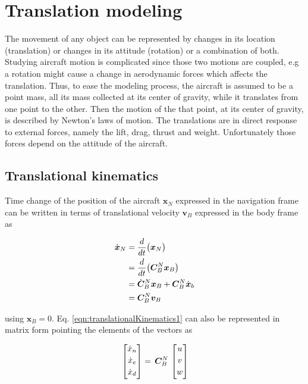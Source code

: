 \section{Translation modeling}

The movement of any object can be represented by changes in its location (translation) or changes in its attitude (rotation) or a combination of both. 
Studying aircraft motion is complicated since those two motions are coupled, e.g a rotation might cause a change in aerodynamic forces which affects the translation. 
Thus, to ease the modeling process, the aircraft is assumed to be a point mass, all its mass collected at its center of gravity, while it translates from one point to the other.
Then the motion of the that point, at its center of gravity, is described by Newton's laws of motion.
The translations are in direct response to external forces, namely the lift, drag, thrust and weight.
Unfortunately those forces depend on the attitude of the aircraft.

\subsection{Translational kinematics}

Time change of the position of the aircraft $\bm{x}_N$ expressed in the navigation frame can be written in terms of translational velocity $\bm{v}_B$ expressed in the body frame as

\begin{align}{\label{eqn:translationalKinematics1}}
\begin{split}
\dot{\bm{x}}_N & = \frac{d}{dt} \big( \bm{x}_N \big) \\
                        & = \frac{d}{dt} \big(\bm{C}_B^N \bm{x}_B \big) \\
                        & = \dot{\bm{C}}_B^N \bm{x}_B + \bm{C}_B^N  \dot{\bm{x}}_b \\
                        & = \bm{C}_B^N \bm{v}_B
\end{split}
\end{align}

using $\bm{x}_B=0$. Eq. \ref{eqn:translationalKinematics1} can also be represented in matrix form pointing the elements of the vectors as

\begin{equation}{\label{eqn:angularMomentumInPrincipleAxes}}
\begin{bmatrix}
\dot{x}_n\\[0.2em]
\dot{x}_e\\[0.2em]
\dot{x}_d\\[0.2em]
\end{bmatrix}
 =\,
\bm{C}_B^N
\,
\begin{bmatrix}
u\\[0.2em]
v\\[0.2em]
w\\[0.2em]
\end{bmatrix}
\end{equation}


